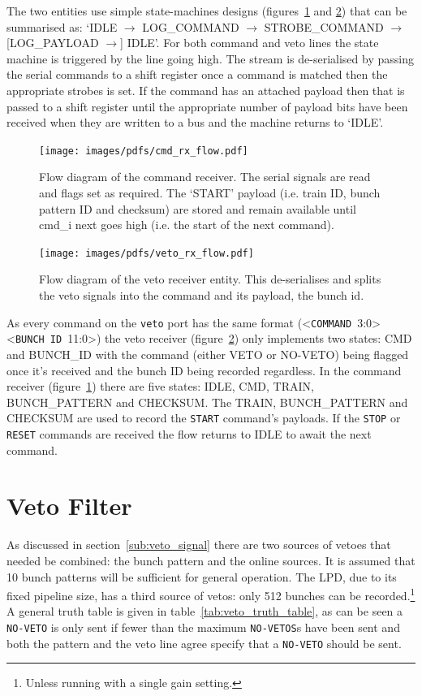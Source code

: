 The two entities use simple state-machines designs (figures~\ref{fig:cmd_rx_flow} and \ref{fig:veto_rx_flow}) that can be summarised as: `IDLE \( \rightarrow \) LOG\_COMMAND \( \rightarrow \) STROBE\_COMMAND \( \rightarrow \) [LOG\_PAYLOAD \( \rightarrow \)] IDLE'. For both command and veto lines the state machine is triggered by the line going high. The stream is de-serialised by passing the serial commands to a shift register once a command is matched then the appropriate strobes is set. If the command has an attached payload then that is passed to a shift register until the appropriate number of payload bits have been received when they are written to a bus and the machine returns to `IDLE'.
\begin{figure}[htbp]
  \centering
  \texttt{[image: images/pdfs/cmd\_rx\_flow.pdf]}
  \caption{Flow diagram of the command receiver. The serial signals are read and flags set as required. The `START' payload (i.e. train ID, bunch pattern ID and checksum) are stored and remain available until cmd\_i next goes high (i.e. the start of the next command).}
  \label{fig:cmd_rx_flow}
\end{figure}
\begin{figure}[htbp]
  \centering
  \texttt{[image: images/pdfs/veto\_rx\_flow.pdf]}
  \caption{Flow diagram of the veto receiver entity. This de-serialises and splits the veto signals into the command and its payload, the bunch id.}
  \label{fig:veto_rx_flow}
\end{figure}

As every command on the \texttt{veto} port has the same format (<\texttt{COMMAND}~3:0><\texttt{BUNCH~ID}~11:0>) the veto receiver (figure~\ref{fig:veto_rx_flow}) only implements two states: CMD and BUNCH\_ID with the command (either VETO or NO-VETO) being flagged once it's received and the bunch ID being recorded regardless. In the command receiver (figure~\ref{fig:cmd_rx_flow}) there are five states: IDLE, CMD, TRAIN, BUNCH\_PATTERN and CHECKSUM. The TRAIN, BUNCH\_PATTERN and CHECKSUM are used to record the \texttt{START} command's payloads. If the \texttt{STOP} or \texttt{RESET} commands are received the flow returns to IDLE to await the next command. 
\section{Veto Filter} %
\label{sec:veto_filter}
As discussed in section~\ref{sub:veto_signal} there are two sources of vetoes that needed be combined: the bunch pattern and the online sources. It is assumed that 10 bunch patterns will be sufficient for general operation. The LPD, due to its fixed pipeline size, has a third source of vetos: only 512 bunches can be recorded.\footnote{Unless running with a single gain setting.} A general truth table is given in table~\ref{tab:veto_truth_table}, as can be seen a \texttt{NO-VETO} is only sent if fewer than the maximum \texttt{NO-VETOS}s have been sent and both the pattern and the veto line agree specify that a \texttt{NO-VETO} should be sent.
    

